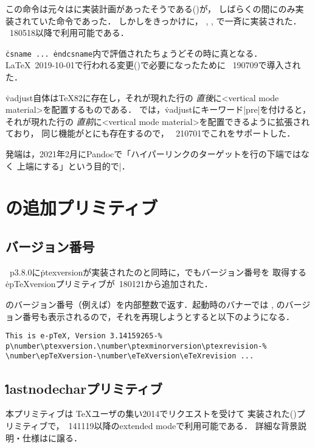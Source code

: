 \documentclass[a4paper,11pt,nomag,dvipdfmx]{jsarticle}
\begin{document}
\begin{cslist}
  この命令は元々はに実装計画があったそうである(\cite{expanded})が，
  しばらくの間にのみ実装されていた命令であった．
  しかし\cite{expanded1}をきっかけに，
  , \epTeX, で一斉に実装された．
  \epTeX~180518以降で利用可能である．

 \csitem[\.{ifincsname}]
  \texttt{\.{csname}~...~\.{endcsname}}内で評価されたちょうどその時に真となる．
  \LaTeX~2019-10-01で行われる変更(\cite{latex95,tjb83})で必要になったために
  \epTeX~190709で導入された．

  \.{vadjust}自体は\TeX82に存在し，それが現れた行の
  \emph{直後}に<vertical mode material>を配置するものである．
  では，\.{vadjust}にキーワード|pre|を付けると，それが現れた行の
  \emph{直前}に<vertical mode material>を配置できるように拡張されており，
  同じ機能がとにも存在するので，
  \epTeX~210701でこれをサポートした．

  発端は，2021年2月にPandocで「ハイパーリンクのターゲットを行の下端ではなく
  上端にする」という目的で|．
\end{cslist}


\section{\epTeX の追加プリミティブ}

\subsection{バージョン番号}
\pTeX~p3.8.0に\.{ptexversion}が実装されたのと同時に，\epTeX でもバージョン番号を
取得する\.{epTeXversion}プリミティブが\epTeX~180121から追加された．

\begin{cslist}
  \epTeX のバージョン番号（例えば\the\epTeXversion）を内部整数で返す．\epTeX 起動時のバナーでは
  \eTeX, \pTeX のバージョン番号も表示されるので，それを再現しようとすると以下のようになる．
\begin{verbatim}
This is e-pTeX, Version 3.14159265-%
p\number\ptexversion.\number\ptexminorversion\ptexrevision-%
\number\epTeXversion-\number\eTeXversion\eTeXrevision ...
\end{verbatim}
\end{cslist}


\subsection{\.{lastnodechar}プリミティブ}
本プリミティブは
\TeX ユーザの集い2014でリクエストを受けて
実装された(\cite{pdfse})プリミティブで，\epTeX~141119以降のextended modeで利用可能である．
詳細な背景説明・仕様は\cite{lnc}に譲る．
\end{document}
